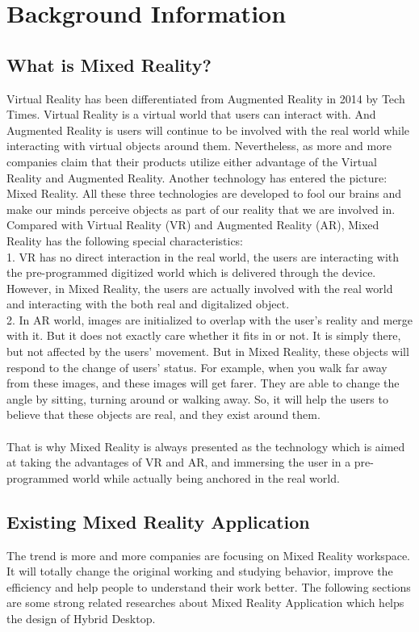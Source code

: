 
\chapter{Background Information} %

\label{Chapter3} %
\section{What is Mixed Reality?}
Virtual Reality has been differentiated from Augmented Reality in 2014 by Tech Times. Virtual Reality is a virtual world that users can interact with. And Augmented Reality is users will continue to be involved with the real world while interacting with virtual objects around them. Nevertheless, as more and more companies claim that their products utilize either advantage of the Virtual Reality and Augmented Reality. Another technology has entered the picture: Mixed Reality. All these three technologies are developed to fool our brains and make our minds perceive objects as part of our reality that we are involved in. Compared with Virtual Reality (VR) and Augmented Reality (AR), Mixed Reality has the following special characteristics:
\\
1. VR has no direct interaction in the real world, the users are interacting with the pre-programmed digitized world which is delivered through the device. However, in Mixed Reality, the users are actually involved with the real world and interacting with the both real and digitalized object.
\\
2. In AR world, images are initialized to overlap with the user’s reality and merge with it. But it does not exactly care whether it fits in or not. It is simply there, but not affected by the users’ movement. But in Mixed Reality, these objects will respond to the change of users’ status. For example, when you walk far away from these images, and these images will get farer. They are able to change the angle by sitting, turning around or walking away. So, it will help the users to believe that these objects are real, and they exist around them.
\\
\\
That is why Mixed Reality is always presented as the technology which is aimed at taking the advantages of VR and AR, and immersing the user in a pre-programmed world while actually being anchored in the real world.

\section{Existing Mixed Reality Application}
The trend is more and more companies are focusing on Mixed Reality workspace. It will totally change the original working and studying behavior, improve the efficiency and help people to understand their work better. The following sections are some strong related researches about Mixed Reality Application which helps the design of Hybrid Desktop.
